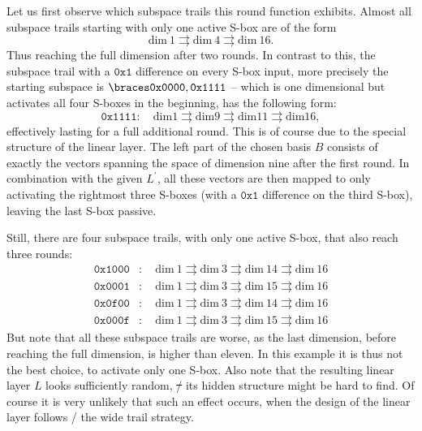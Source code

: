 \begin{example}
Let us first observe which subspace trails this round function exhibits.
Almost all subspace trails starting with only one active S-box are of the form
\begin{equation*}
    \mathrm{dim}\ 1 \rightrightarrows \mathrm{dim}\ 4 \rightrightarrows \mathrm{dim}\ 16.
\end{equation*}
Thus reaching the full dimension after two rounds.
In contrast to this, the subspace trail with a $\mathtt{0x1}$ difference on every S-box input, more precisely the starting subspace is $\set{\mathtt{0x0000}, \mathtt{0x1111}}$ -- which is one dimensional but activates all four S-boxes in the beginning, has the following form:
\begin{equation}\label{st:eqn:example1}
    \mathtt{0x1111} :\quad \mathrm{dim} 1 \rightrightarrows \mathrm{dim} 9 \rightrightarrows \mathrm{dim} 11 \rightrightarrows \mathrm{dim} 16,
\end{equation}
effectively lasting for a full additional round.
This is of course due to the special structure of the linear layer.
The left part of the chosen basis $B$ consists of exactly the vectors spanning the space of dimension nine after the first round.
In combination with the given $L^\prime$, all these vectors are then mapped to only activating the rightmost three S-boxes (with a $\mathtt{0x1}$ difference on the third S-box), leaving the last S-box passive.

Still, there are four subspace trails, with only one active S-box, that also reach three rounds:
\begin{align*}
    \mathtt{0x1000} &:\quad \mathrm{dim}\ 1 \rightrightarrows \mathrm{dim}\ 3 \rightrightarrows \mathrm{dim}\ 14 \rightrightarrows \mathrm{dim}\ 16 \\
    \mathtt{0x0001} &:\quad \mathrm{dim}\ 1 \rightrightarrows \mathrm{dim}\ 3 \rightrightarrows \mathrm{dim}\ 15 \rightrightarrows \mathrm{dim}\ 16 \\
    \mathtt{0x0f00} &:\quad \mathrm{dim}\ 1 \rightrightarrows \mathrm{dim}\ 3 \rightrightarrows \mathrm{dim}\ 14 \rightrightarrows \mathrm{dim}\ 16 \\
    \mathtt{0x000f} &:\quad \mathrm{dim}\ 1 \rightrightarrows \mathrm{dim}\ 3 \rightrightarrows \mathrm{dim}\ 15 \rightrightarrows \mathrm{dim}\ 16
\end{align*}
But note that all these subspace trails are worse, as the last dimension, before reaching the full dimension, is higher than eleven.
In this example it is thus not the best choice, to activate only one S-box.
Also note that the resulting linear layer $L$ looks sufficiently random, \st/ its hidden structure might be hard to find.
Of course it is very unlikely that such an effect occurs, when the design of the linear layer follows \eg/ the wide trail strategy.
\end{example}

